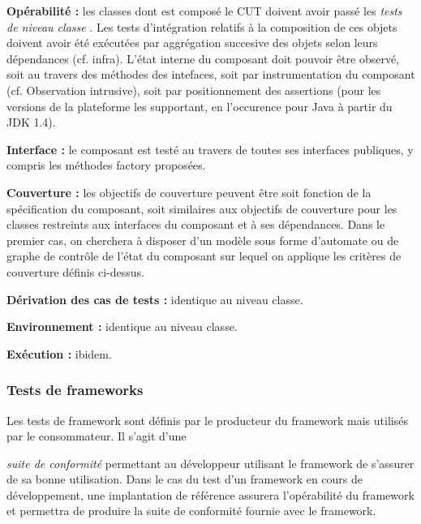 \par
  
\textbf{Op\'erabilit\'e : }
  les classes dont est compos\'e le
    CUT doivent avoir pass\'e les 
\emph{tests de niveau
    classe}
  . Les tests d'int\'egration relatifs
    \`a la composition de ces objets doivent avoir \'et\'e
    ex\'ecut\'ees par aggr\'egation succesive des objets selon
    leurs d\'ependances (cf. infra). L'\'etat interne du composant
    doit pouvoir \^etre observ\'e, soit au travers des m\'ethodes
    des intefaces, soit par instrumentation du composant
    (cf. Observation intrusive), soit par positionnement des
    assertions (pour les versions de la plateforme les supportant, en
    l'occurence pour Java \`a partir du JDK 1.4).
\par
  
\textbf{Interface :}
   le composant est test\'e au travers de
    toutes ses interfaces publiques, y compris les m\'ethodes factory
    propos\'ees.
\par
  
\textbf{Couverture : }
   les objectifs de couverture peuvent
    \^etre soit fonction de la sp\'ecification du composant, soit
    similaires aux objectifs de couverture pour les classes restreints
    aux interfaces du composant et \`a ses d\'ependances. Dans le
    premier cas, on cherchera \`a disposer d'un mod\`ele sous forme
    d'automate ou de graphe de contr\^ole de l'\'etat du
    composant sur lequel on applique les crit\`eres de couverture
    d\'efinis ci-dessus. 
\par
  
\textbf{D\'erivation des cas de tests :}
   identique au niveau classe.
\par
  
\textbf{Environnement :}
   identique au niveau classe.

\par
  
\textbf{Ex\'ecution :}
   ibidem.
\par
  
\subsubsection{Tests de frameworks}
  
    Les tests de framework sont d\'efinis par le producteur du
    framework mais utilis\'es par le consommateur. Il s'agit d'une
    
\emph{suite de conformit\'e}
   permettant au d\'eveloppeur
    utilisant le framework de s'assurer de sa bonne utilisation.
    Dans le cas du test d'un framework en cours de d\'eveloppement,
    une implantation de r\'ef\'erence assurera l'op\'erabilit\'e
    du framework et permettra de produire la suite de conformit\'e
    fournie avec le framework.
    
